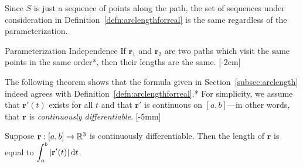 \documentclass{watsonbook}
\begin{document}
Since $S$ is just a sequence of points along the path, the set of
sequences under consideration in
Definition~\ref{defn:arclengthforreal} is the same regardless of
the parameterization.

\begin{theo}{Parameterization Independence}{}
  If $\mathbf{r}_1$ and $\mathbf{r}_2$ are two paths which visit the
  same points in the same order*, then their lengths are the
  same. [-2cm]
\end{theo}

The following theorem shows that the formula given in
Section~\ref{subsec:arclength} indeed agrees with
Definition~\ref{defn:arclengthforreal}.* For simplicity, we assume
that $\mathbf{r}'(t)$ exists for all $t$ and that $\mathbf{r}'$ is
continuous on $[a,b]$---in other words, that $\mathbf{r}$ is
\textit{continuously differentiable}.  [-5mm]

\begin{theo}{}{}
  Suppose $\mathbf{r}:[a,b] \to \mathbb{R}^3$ is continuously
  differentiable. Then the length of $\mathbf{r}$ is equal to
  $\displaystyle{\int_a^b |\mathbf{r}'(t)| \, \mathrm{d}t}$.
\end{theo}
\end{document}
